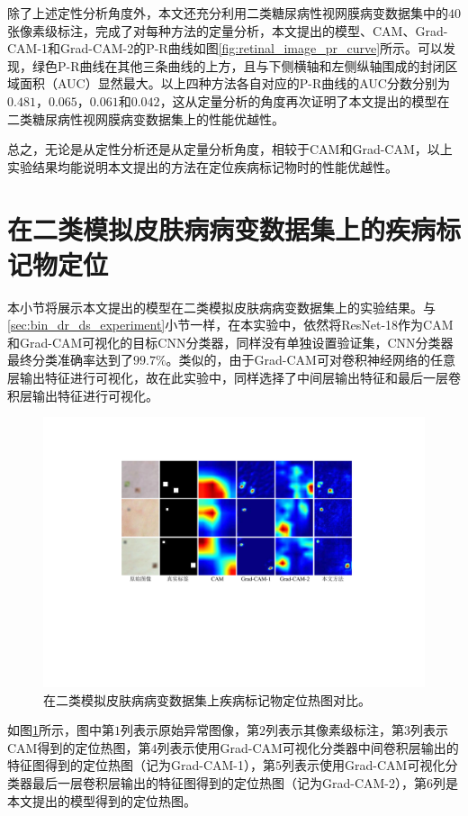 除了上述定性分析角度外，本文还充分利用二类糖尿病性视网膜病变数据集中的$40$张像素级标注，完成了对每种方法的定量分析，本文提出的模型、CAM、Grad-CAM-1和Grad-CAM-2的P-R曲线如图\ref{fig:retinal_image_pr_curve}所示。可以发现，绿色P-R曲线在其他三条曲线的上方，且与下侧横轴和左侧纵轴围成的封闭区域面积（AUC）显然最大。以上四种方法各自对应的P-R曲线的AUC分数分别为$0.481$，$0.065$，$0.061$和$0.042$，这从定量分析的角度再次证明了本文提出的模型在二类糖尿病性视网膜病变数据集上的性能优越性。

总之，无论是从定性分析还是从定量分析角度，相较于CAM和Grad-CAM，以上实验结果均能说明本文提出的方法在定位疾病标记物时的性能优越性。
\section{在二类模拟皮肤病病变数据集上的疾病标记物定位}\label{sec:bin_simulated_ds_experiment}
本小节将展示本文提出的模型在二类模拟皮肤病病变数据集上的实验结果。与\ref{sec:bin_dr_ds_experiment}小节一样，在本实验中，依然将ResNet-18作为CAM和Grad-CAM可视化的目标CNN分类器，同样没有单独设置验证集，CNN分类器最终分类准确率达到了$99.7\%$。类似的，由于Grad-CAM可对卷积神经网络的任意层输出特征进行可视化，故在此实验中，同样选择了中间层输出特征和最后一层卷积层输出特征进行可视化。
\begin{figure}[h]
	\centering
	\includegraphics[width=1.0\textwidth]{figure/pr_curve_skin_image.pdf}
	\caption[在二类模拟皮肤病病变数据集上疾病标记物定位热图对比]{在二类模拟皮肤病病变数据集上疾病标记物定位热图对比。} 
	\label{fig:simulated_skin}
\end{figure}

如图\ref{fig:simulated_skin}所示，图中第$1$列表示原始异常图像，第$2$列表示其像素级标注，第$3$列表示CAM得到的定位热图，第$4$列表示使用Grad-CAM可视化分类器中间卷积层输出的特征图得到的定位热图（记为Grad-CAM-1），第$5$列表示使用Grad-CAM可视化分类器最后一层卷积层输出的特征图得到的定位热图（记为Grad-CAM-2），第$6$列是本文提出的模型得到的定位热图。

